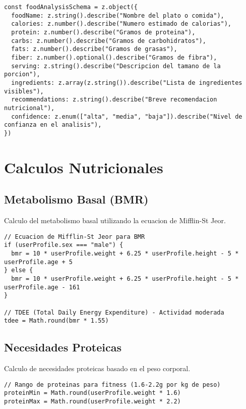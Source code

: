 \documentclass[12pt,a4paper]{article}
\begin{document}
\begin{lstlisting}[caption=Schema Zod para validacion de analisis]
const foodAnalysisSchema = z.object({
  foodName: z.string().describe("Nombre del plato o comida"),
  calories: z.number().describe("Numero estimado de calorias"),
  protein: z.number().describe("Gramos de proteina"),
  carbs: z.number().describe("Gramos de carbohidratos"),
  fats: z.number().describe("Gramos de grasas"),
  fiber: z.number().optional().describe("Gramos de fibra"),
  serving: z.string().describe("Descripcion del tamano de la porcion"),
  ingredients: z.array(z.string()).describe("Lista de ingredientes visibles"),
  recommendations: z.string().describe("Breve recomendacion nutricional"),
  confidence: z.enum(["alta", "media", "baja"]).describe("Nivel de confianza en el analisis"),
})
\end{lstlisting}

\section{Calculos Nutricionales}

\subsection{Metabolismo Basal (BMR)}

Calculo del metabolismo basal utilizando la ecuacion de Mifflin-St Jeor.

\begin{lstlisting}[caption=Calculo de BMR personalizado]
// Ecuacion de Mifflin-St Jeor para BMR
if (userProfile.sex === "male") {
  bmr = 10 * userProfile.weight + 6.25 * userProfile.height - 5 * userProfile.age + 5
} else {
  bmr = 10 * userProfile.weight + 6.25 * userProfile.height - 5 * userProfile.age - 161
}

// TDEE (Total Daily Energy Expenditure) - Actividad moderada
tdee = Math.round(bmr * 1.55)
\end{lstlisting}

\subsection{Necesidades Proteicas}

Calculo de necesidades proteicas basado en el peso corporal.

\begin{lstlisting}[caption=Calculo de proteinas recomendadas]
// Rango de proteinas para fitness (1.6-2.2g por kg de peso)
proteinMin = Math.round(userProfile.weight * 1.6)
proteinMax = Math.round(userProfile.weight * 2.2)
\end{lstlisting}
\end{document}
